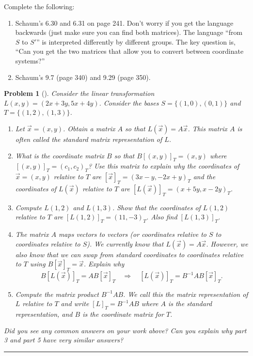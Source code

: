 \documentclass[letterpaper,oneside]{book}%
\theoremstyle{plain}
\theoremstyle{box}
\theoremstyle{problem}
\newtheorem{problemnum}{Problem}[chapter]
\newtheorem*{hwenum*}{Home Work Practice}
\newenvironment{problem}[1][]{\begin{problemnum}[#1]}{\end{problemnum}\nopagebreak\hrule\bigskip}
\newenvironment{hw*}[1][]{\begin{hwenum*}[#1]}{\end{hwenum*}\nopagebreak\hrule\bigskip}
\begin{document}
\begin{hw*}
 Complete the following:
 \begin{enumerate}
  \item Schaum's 6.30 and 6.31 on page 241.  Don't worry if you get the language backwards (just make sure you can find both matrices).  The language ``from $S$ to $S'$'' is interpreted differently by different groups.  The key question is, ``Can you get the two matrices that allow you to convert between coordinate systems?''
  \item Schaum's 9.7 (page 340) and 9.29 (page 350).  
 \end{enumerate}
\end{hw*}




\begin{problem}
Consider the linear transformation $L(x,y) = (2x+3y,5x+4y)$.  Consider the bases $S=\{(1,0),(0,1)\}$ and $T=\{(1,2),(1,3)\}$.
\begin{enumerate}
 \item Let $\vec x=(x,y)$. Obtain a matrix $A$ so that $L(\vec x)=A\vec x$. This matrix $A$ is often called the standard matrix representation of $L$.
 \item What is the coordinate matrix $B$ so that $B[(x,y)]_T=(x,y)$ where $[(x,y)]_T = (c_1,c_2)_T$? Use this matrix to explain why the coordinates of $\vec x = (x,y)$ relative to $T$ are $[\vec x ]_T = (3x-y,-2x+y)_T$ and the coordinates of $L(\vec x )$ relative to $T$ are $[L(\vec x)]_T=(x+5y,x-2y)_T$.
 \item Compute $L(1,2)$ and $L(1,3)$. Show that the coordinates of $L(1,2)$ relative to $T$ are $[L(1,2)]_T=(11,-3)_T$. Also find $[L(1,3)]_T$.
 \item The matrix $A$ maps vectors to vectors (or coordinates relative to $S$ to coordinates relative to $S$).  We currently know that $L(\vec x ) = A\vec x$.  However, we also know that we can swap from standard coordinates to coordinates relative to $T$ using $B[\vec x]_T=\vec x$.  Explain why 
 $$B[L(\vec x)]_T = AB[\vec x]_T\quad \Rightarrow \quad [L(\vec x)]_T =B^{-1}AB[\vec x]_T.$$ 
 \item Compute the matrix product $B^{-1}AB$. We call this the matrix representation of $L$ relative to $T$ and write $[L]_T = B^{-1}AB$ where $A$ is the standard representation, and $B$ is the coordinate matrix for $T$.
\end{enumerate}
Did you see any common answers on your work above? Can you explain why part 3 and part 5 have very similar answers?
\end{problem}
\end{document}
